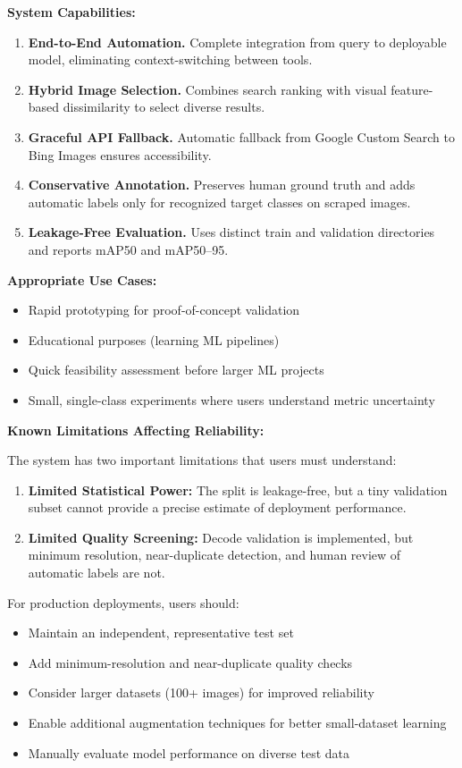 \documentclass[12pt, letterpaper]{article}
\begin{document}
\textbf{System Capabilities:}
\begin{enumerate}
  \item \textbf{End-to-End Automation.} Complete integration from query to deployable model, 
    eliminating context-switching between tools.
  \item \textbf{Hybrid Image Selection.} Combines search ranking with visual feature-based 
    dissimilarity to select diverse results.
  \item \textbf{Graceful API Fallback.} Automatic fallback from Google Custom Search to 
    Bing Images ensures accessibility.
  \item \textbf{Conservative Annotation.} Preserves human ground truth and adds automatic
    labels only for recognized target classes on scraped images.
  \item \textbf{Leakage-Free Evaluation.} Uses distinct train and validation directories
    and reports mAP50 and mAP50--95.
\end{enumerate}

\textbf{Appropriate Use Cases:}
\begin{itemize}
  \item Rapid prototyping for proof-of-concept validation
  \item Educational purposes (learning ML pipelines)
  \item Quick feasibility assessment before larger ML projects
  \item Small, single-class experiments where users understand metric uncertainty
\end{itemize}

\textbf{Known Limitations Affecting Reliability:}

The system has two important limitations that users must understand:

\begin{enumerate}
  \item \textbf{Limited Statistical Power:} The split is leakage-free, but a tiny validation
    subset cannot provide a precise estimate of deployment performance.
  \item \textbf{Limited Quality Screening:} Decode validation is implemented, but minimum
    resolution, near-duplicate detection, and human review of automatic labels are not.
\end{enumerate}

For production deployments, users should:
\begin{itemize}
  \item Maintain an independent, representative test set
  \item Add minimum-resolution and near-duplicate quality checks
  \item Consider larger datasets (100+ images) for improved reliability
  \item Enable additional augmentation techniques for better small-dataset learning
  \item Manually evaluate model performance on diverse test data
\end{itemize}
\end{document}
